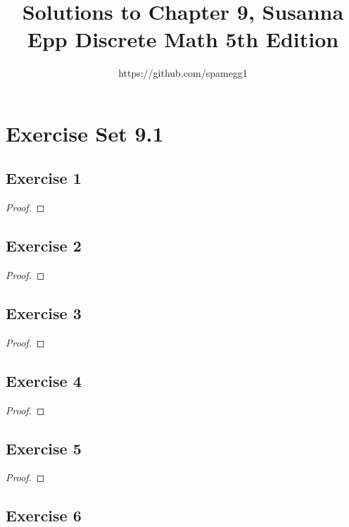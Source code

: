 \documentclass[14pt]{extarticle}
\title{Solutions to Chapter 9, Susanna Epp Discrete Math 5th Edition}
\author{https://github.com/spamegg1}
\begin{document}
\maketitle
\tableofcontents

\section{Exercise Set 9.1}

\subsection{Exercise 1}

\begin{proof}

\end{proof}

\subsection{Exercise 2}

\begin{proof}

\end{proof}

\subsection{Exercise 3}

\begin{proof}

\end{proof}

\subsection{Exercise 4}

\begin{proof}

\end{proof}

\subsection{Exercise 5}

\begin{proof}

\end{proof}

\subsection{Exercise 6}
\end{document}
